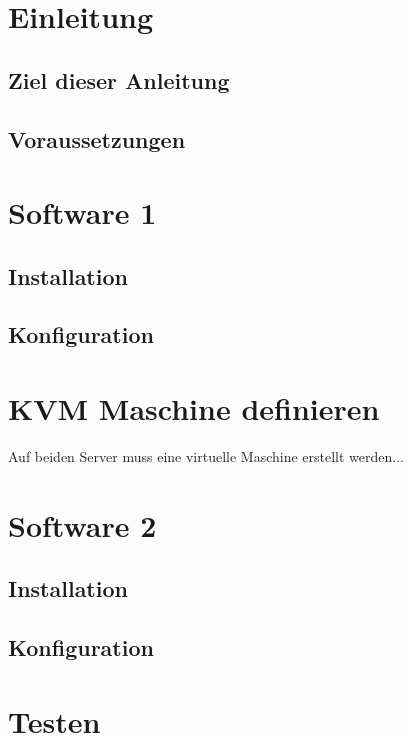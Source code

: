 \section{Einleitung}


\subsection{Ziel dieser Anleitung}


\subsection{Voraussetzungen}

\section{Software 1}
\subsection{Installation}

\subsection{Konfiguration}

\section{KVM Maschine definieren}
Auf beiden Server muss eine virtuelle Maschine erstellt werden...
\section{Software 2}
\subsection{Installation}

\subsection{Konfiguration}

\section{Testen}
